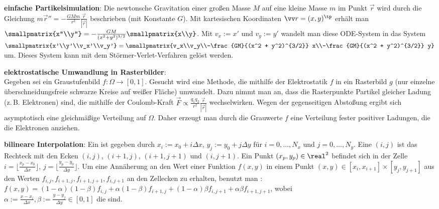 \textbf{einfache Partikelsimulation}:
Die newtonsche Gravitation einer großen Masse $M$ auf eine kleine Masse $m$
im Punkt $\vec{r}$ wird durch die Gleichung
$m\vec{r}'' = -\frac{GMm}{r^2} \frac{\vec{r}}{|\vec{r}|}$ beschrieben (mit Konstante $G$).
Mit kartesischen Koordinaten $\vec{r} = (x, y)^\tp$ erhält man
$\smallpmatrix{x''\\y''} = -\frac{GM}{(x^2 + y^2)^{3/2}} \smallpmatrix{x\\y}$.
Mit $v_x := x'$ und $v_y := y'$ wandelt man diese ODE-System in das System
$\smallpmatrix{x'\\y'\\v_x'\\v_y'}
= \smallpmatrix{v_x\\v_y\\-\frac{GM}{(x^2 + y^2)^{3/2}} x\\-\frac{GM}{(x^2 + y^2)^{3/2}} y}$
um.
Dieses System kann mit dem Störmer-Verlet-Verfahren gelöst werden.

\linie

\textbf{elektrostatische Umwandlung in Rasterbilder}:\\
Gegeben sei ein Graustufenbild $f\colon \Omega \to [0, 1]$.
Gesucht wird eine Methode, die mithilfe der Elektrostatik $f$ in ein Rasterbild $g$
(nur einzelne überschneidungsfreie schwarze Kreise auf weißer Fläche) umwandelt.
Dazu nimmt man an, dass die Rasterpunkte Partikel gleicher Ladung (z.\,B. Elektronen) sind,
die mithilfe der Coulomb-Kraft $\vec{F} \propto \frac{q_1 q_2}{r^2} \frac{\vec{r}}{|\vec{r}|}$
wechselwirken.
Wegen der gegenseitigen Abstoßung ergibt sich asymptotisch eine gleichmäßige Verteilung
auf $\Omega$.
Daher erzeugt man durch die Grauwerte $f$ eine Verteilung fester positiver Ladungen,
die die Elektronen anziehen.

\linie

\textbf{bilineare Interpolation}:
Ein  ist gegeben durch
$x_i := x_0 + i \Delta x$, $y_j := y_0 + j \Delta y$ für
$i = 0, \dotsc, N_x$ und $j = 0, \dotsc, N_y$.
Eine  $(i, j)$ ist das Rechteck mit den Ecken
$(i, j)$, $(i+1, j)$, $(i+1, j+1)$ und $(i, j+1)$.
Ein Punkt $(x_p, y_p) \in \real^2$ befindet sich in der Zelle
$i = \lfloor \frac{x_p - x_0}{\Delta x} \rfloor$,
$j = \lfloor \frac{y_p - y_0}{\Delta y} \rfloor$.
Um eine Annäherung an den Wert einer Funktion $f(x, y)$ in einem Punkt
$(x, y) \in [x_i, x_{i+1}] \times [y_j, y_{j+1}]$ aus den Werten
$f_{i,j}, f_{i+1,j}, f_{i+1,j+1}, f_{i,j+1}$ an den Zellecken zu erhalten,
benutzt man :\\
$f(x, y) = (1-\alpha)(1-\beta) f_{i,j} + \alpha(1-\beta) f_{i+1,j} +
(1-\alpha)\beta f_{i,j+1} + \alpha\beta f_{i+1,j+1}$, wobei\\
$\alpha := \frac{x - x_i}{\Delta x}, \beta := \frac{y - y_j}{\Delta y} \in [0, 1]$
die  sind.

